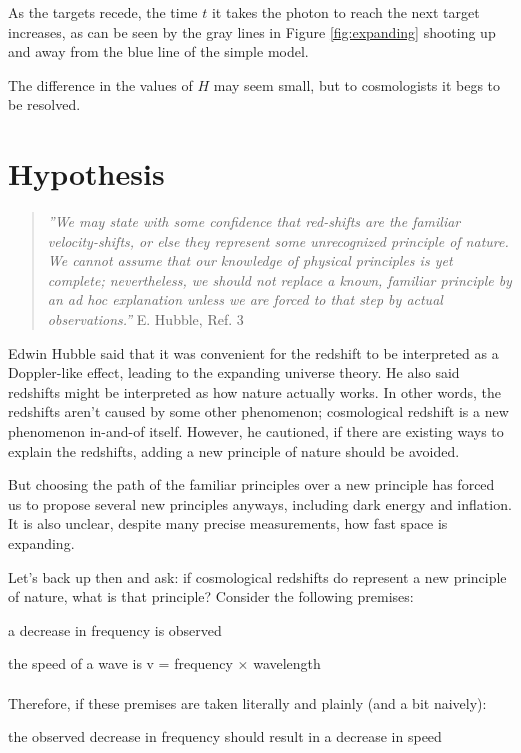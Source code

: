 \documentclass{ws-mpla}
\begin{document}
As the targets recede, the time $t$ it takes the photon to reach the next target increases, as can be seen by the gray lines in Figure \ref{fig:expanding} 
shooting up and away from the blue line of the simple model.

The difference in the values of $H$ may seem small, but to cosmologists it begs to be resolved.

\section{Hypothesis}

\begin{quote}
\emph{''We may state with some confidence that red-shifts are the familiar velocity-shifts, or else they represent some unrecognized principle of nature. 
We cannot assume that our knowledge of physical principles is yet complete; 
nevertheless, we should not replace a known, familiar principle by an ad hoc explanation unless we are forced to that step by actual observations.''}
E. Hubble, Ref. 3
\end{quote}



Edwin Hubble said that it was convenient for the redshift to be interpreted as a Doppler-like effect, leading to the expanding universe theory. He also said redshifts might be interpreted as how nature actually works. In other words, the redshifts aren't caused by some other phenomenon; cosmological redshift is a new phenomenon in-and-of itself. However, he cautioned, if there are existing ways to explain the redshifts, adding a new principle of nature should be avoided.

But choosing the path of the familiar principles over a new principle has forced us to propose several new principles anyways, including dark energy and inflation. 
It is also unclear, despite many precise measurements, how fast space is expanding.

Let's back up then and ask: if cosmological redshifts do represent a new principle of nature, what is that principle? Consider the following premises:

\begin{romanlist}
 \item a decrease in frequency is observed 
 \item the speed of a wave is v = frequency $\times$ wavelength 
\\
\\
Therefore, if these premises are taken literally and plainly (and a bit naively):
\\
 \item the observed decrease in frequency should result in a decrease in speed
\end{romanlist}
\end{document}
